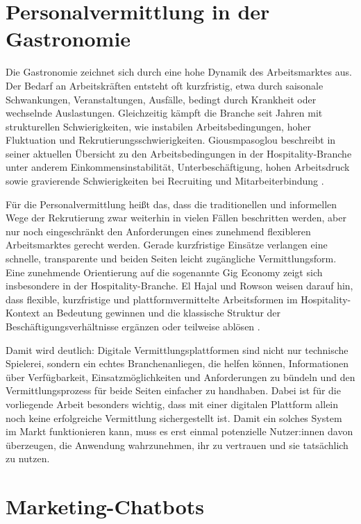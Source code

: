 \setauthor{\secondauthor}
\section{Personalvermittlung in der Gastronomie}

Die Gastronomie zeichnet sich durch eine hohe Dynamik des Arbeitsmarktes aus.
Der Bedarf an Arbeitskräften entsteht oft kurzfristig, etwa durch saisonale Schwankungen,
Veranstaltungen, Ausfälle, bedingt durch Krankheit oder wechselnde Auslastungen.
Gleichzeitig kämpft die Branche seit Jahren mit strukturellen Schwierigkeiten,
wie instabilen Arbeitsbedingungen, hoher Fluktuation und 
Rekrutierungsschwierigkeiten. Giousmpasoglou beschreibt in seiner aktuellen 
Übersicht zu den Arbeitsbedingungen in der Hospitality-Branche unter anderem 
Einkommensinstabilität, Unterbeschäftigung, hohen Arbeitsdruck sowie gravierende 
Schwierigkeiten bei Recruiting und Mitarbeiterbindung \cite{Giousmpasoglou2024}.

Für die Personalvermittlung heißt das, dass die traditionellen und informellen 
Wege der Rekrutierung zwar weiterhin in vielen Fällen beschritten werden, aber 
nur noch eingeschränkt den Anforderungen eines zunehmend flexibleren 
Arbeitsmarktes gerecht werden. Gerade kurzfristige Einsätze verlangen eine 
schnelle, transparente und beiden Seiten leicht zugängliche Vermittlungsform. 
Eine zunehmende Orientierung auf die sogenannte Gig Economy zeigt sich 
insbesondere in der Hospitality-Branche. El Hajal und Rowson weisen darauf hin, 
dass flexible, kurzfristige und plattformvermittelte Arbeitsformen im 
Hospitality-Kontext an Bedeutung gewinnen und die klassische Struktur der 
Beschäftigungsverhältnisse ergänzen oder teilweise ablösen
\cite{ElHajal2021}.

Damit wird deutlich: Digitale Vermittlungsplattformen sind nicht nur 
technische Spielerei, sondern ein echtes Branchenanliegen, die helfen können, 
Informationen über Verfügbarkeit, Einsatzmöglichkeiten und Anforderungen zu 
bündeln und den Vermittlungsprozess für beide Seiten einfacher zu handhaben. 
Dabei ist für die vorliegende Arbeit besonders wichtig, dass mit einer digitalen 
Plattform allein noch keine erfolgreiche Vermittlung sichergestellt ist. Damit 
ein solches System im Markt funktionieren kann, muss es erst einmal potenzielle 
Nutzer:innen davon überzeugen, die Anwendung wahrzunehmen, ihr zu vertrauen und 
sie tatsächlich zu nutzen.

\section{Marketing-Chatbots}

